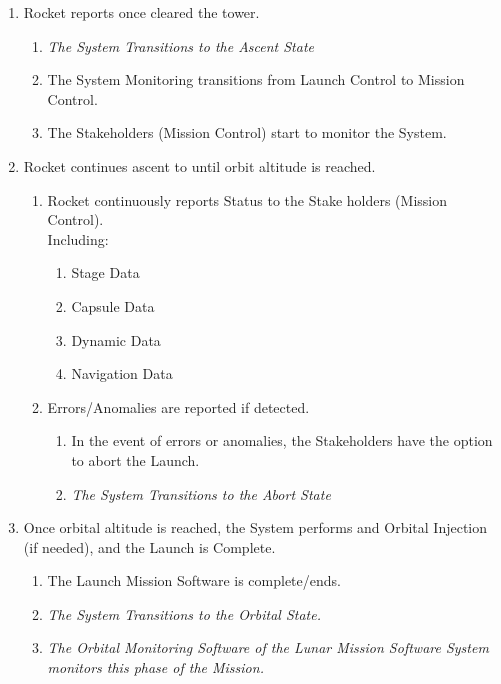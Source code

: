 \documentclass[letterpaper]{article}
\begin{document}
\begin{enumerate}
\begin{enumerate}
            to abort
         \item \textit{If Aborted, the Sytem Transitions to the Abort
            State}
      \end{enumerate}
   \item Rocket reports once cleared the tower.
      \begin{enumerate}
         \item \textit{The System Transitions to the Ascent State}
         \item The System Monitoring transitions from Launch Control 
            to Mission Control.
         \item The Stakeholders (Mission Control) start to monitor the
            System. 
      \end{enumerate}
   \item Rocket continues ascent to until orbit altitude is reached.
      \begin{enumerate}
         \item Rocket continuously reports Status to the Stake
            holders (Mission Control). \\Including:
            \begin{enumerate}
               \item Stage Data
               \item Capsule Data
               \item Dynamic Data
               \item Navigation Data
            \end{enumerate}
         \item Errors/Anomalies are reported if detected. 
            \begin{enumerate}
               \item  In the event of errors or anomalies, the 
                  Stakeholders have the option to abort the Launch.
               \item \textit{The System Transitions to the Abort 
                  State}
            \end{enumerate}
      \end{enumerate}
   \item Once orbital altitude is reached, the System performs and
      Orbital Injection (if needed), and the Launch is Complete.
      \begin{enumerate}
         \item The Launch Mission Software is complete/ends.
         \item \textit{The System Transitions to the Orbital State.}
         \item \textit{The Orbital Monitoring Software of the 
            Lunar Mission Software System monitors this phase of the
            Mission.}
      \end{enumerate}
\end{enumerate}
\end{document}
